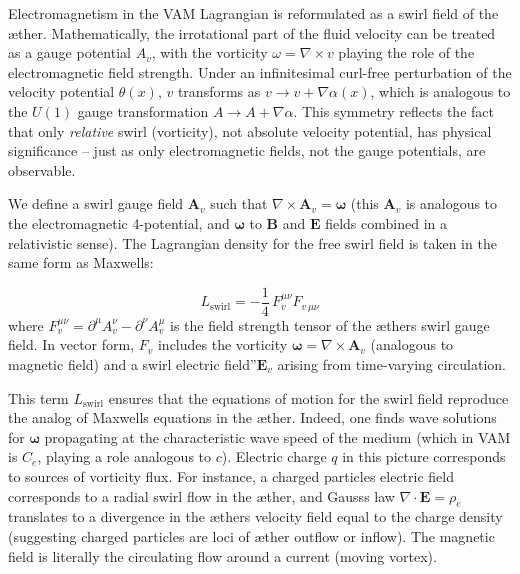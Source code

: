 Electromagnetism in the VAM Lagrangian is reformulated as a swirl field of the æther. Mathematically, the irrotational part of the fluid velocity can be treated as a gauge potential $A_v$, with the vorticity $\omega = \nabla \times v$ playing the role of the electromagnetic field strength. Under an infinitesimal curl-free perturbation of the velocity potential $\theta(x)$, $v$ transforms as $v \to v + \nabla \alpha(x)$, which is analogous to the $U(1)$ gauge transformation $A \to A + \nabla \alpha$. This symmetry reflects the fact that only \textit{relative} swirl (vorticity), not absolute velocity potential, has physical significance – just as only electromagnetic fields, not the gauge potentials, are observable.


We define a swirl gauge field $\mathbf{A}_v$ such that $\nabla \times \mathbf{A}_v = \mathbf{\omega}$ (this $\mathbf{A}_v$ is analogous to the electromagnetic 4-potential, and $\mathbf{\omega}$ to $\mathbf{B}$ and $\mathbf{E}$ fields combined in a relativistic sense). The Lagrangian density for the free swirl field is taken in the same form as Maxwell\rqs s:

\begin{equation}
    L_{\text{swirl}} = -\frac{1}{4}\, F_{v}^{\mu\nu} F_{v\,\mu\nu}
    \label{eq:swirl-lagrangian}
\end{equation}
where $F_v^{\mu\nu} = \partial^\mu A_v^{\nu} - \partial^\nu A_v^{\mu}$ is the field strength tensor of the æther\rqs s swirl gauge field. In vector form, $F_v$ includes the vorticity $\mathbf{\omega} = \nabla \times \mathbf{A}_v$ (analogous to magnetic field) and a \grqq swirl electric field\textquotedblright $\mathbf{E}_v$ arising from time-varying circulation.


This term $L_{\text{swirl}}$ ensures that the equations of motion for the swirl field reproduce the analog of Maxwell\rqs s equations in the æther. Indeed, one finds wave solutions for $\mathbf{\omega}$ propagating at the characteristic wave speed of the medium (which in VAM is $C_e$, playing a role analogous to $c$). Electric charge $q$ in this picture corresponds to sources of vorticity flux. For instance, a charged particle\rqs s electric field corresponds to a radial swirl flow in the æther, and Gauss\rqs s law $\nabla\cdot \mathbf{E} = \rho_e$ translates to a divergence in the æther\rqs s velocity field equal to the charge density (suggesting charged particles are loci of æther outflow or inflow). The magnetic field is literally the circulating flow around a current (moving vortex).



